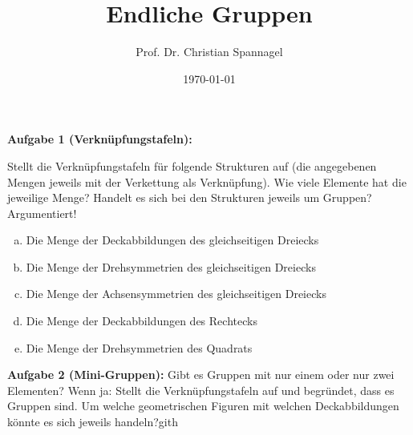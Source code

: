 \documentclass{cssheet}
\title{Endliche Gruppen}
\author{Prof. Dr. Christian Spannagel}
\date{\today}
\begin{document}
\printtitle


\textbf{Aufgabe 1 (Verknüpfungstafeln):} 

Stellt die Verknüpfungstafeln für folgende Strukturen auf (die angegebenen Mengen jeweils mit der Verkettung als Verknüpfung). Wie viele Elemente hat die jeweilige Menge? Handelt es sich bei den Strukturen jeweils um Gruppen? Argumentiert!
\begin{enumerate}[a)]
\item Die Menge der Deckabbildungen des gleichseitigen Dreiecks
\item Die Menge der Drehsymmetrien des  gleichseitigen Dreiecks
\item Die Menge der Achsensymmetrien des gleichseitigen Dreiecks
\item Die Menge der Deckabbildungen des Rechtecks
\item Die Menge der Drehsymmetrien des Quadrats
\end{enumerate}

\textbf{Aufgabe 2 (Mini-Gruppen):}  Gibt es Gruppen mit nur einem oder nur zwei Elementen? Wenn ja: Stellt die Verknüpfungstafeln auf und begründet, dass es Gruppen sind. Um welche geometrischen Figuren mit welchen Deckabbildungen könnte es sich jeweils handeln?gith


\vspace*{2cm}
\printlicense

\printsocials
\end{document}
